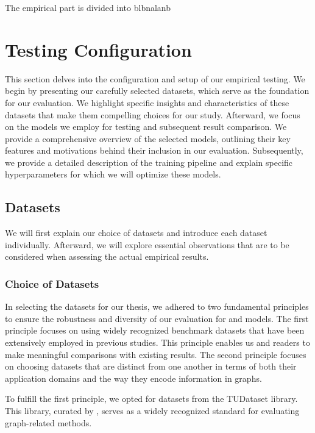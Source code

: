 The empirical part is divided into blbnalanb

\section{Testing Configuration}
This section delves into the configuration and setup of our empirical testing. We begin by presenting our carefully selected datasets, which serve as the foundation for our evaluation. We highlight specific insights and characteristics of these datasets that make them compelling choices for our study. Afterward, we focus on the models we employ for testing and subsequent result comparison. We provide a comprehensive overview of the selected models, outlining their key features and motivations behind their inclusion in our evaluation. Subsequently, we provide a detailed description of the training pipeline and explain specific hyperparameters for which we will optimize these models.

\subsection{Datasets}\label{sec:datasets}
We will first explain our choice of datasets and introduce each dataset individually. Afterward, we will explore essential observations that are to be considered when assessing the actual empirical results.

\subsubsection{Choice of Datasets}
In selecting the datasets for our thesis, we adhered to two fundamental principles to ensure the robustness and diversity of our evaluation for \gnn and \wlnn models. The first principle focuses on using widely recognized benchmark datasets that have been extensively employed in previous studies. This principle enables us and readers to make meaningful comparisons with existing results. The second principle focuses on choosing datasets that are distinct from one another in terms of both their application domains and the way they encode information in graphs.

To fulfill the first principle, we opted for datasets from the TUDataset library. This library, curated by \cite{Mor+2020}, serves as a widely recognized standard for evaluating graph-related methods.


